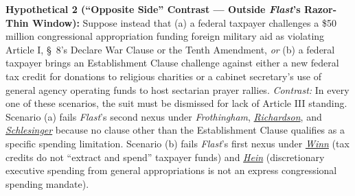 \documentclass[12pt]{article}
\begin{document}
\textbf{Hypothetical 2 (``Opposite Side'' Contrast --- Outside \textit{Flast}'s Razor-Thin Window):} Suppose instead that (a) a federal taxpayer challenges a \$50 million congressional appropriation funding foreign military aid as violating Article I, \S\ 8's Declare War Clause or the Tenth Amendment, \textit{or} (b) a federal taxpayer brings an Establishment Clause challenge against either a new federal tax credit for donations to religious charities or a cabinet secretary's use of general agency operating funds to host sectarian prayer rallies. \textit{Contrast:} In every one of these scenarios, the suit must be dismissed for lack of Article III standing. Scenario (a) fails \textit{Flast}'s second nexus under \textit{Frothingham}, \href{https://supreme.justia.com/cases/federal/us/418/166/}{\textit{Richardson}}, and \href{https://supreme.justia.com/cases/federal/us/418/208/}{\textit{Schlesinger}} because no clause other than the Establishment Clause qualifies as a specific spending limitation. Scenario (b) fails \textit{Flast}'s first nexus under \href{https://supreme.justia.com/cases/federal/us/563/125/}{\textit{Winn}} (tax credits do not ``extract and spend'' taxpayer funds) and \href{https://supreme.justia.com/cases/federal/us/551/587/}{\textit{Hein}} (discretionary executive spending from general appropriations is not an express congressional spending mandate).
\end{document}
